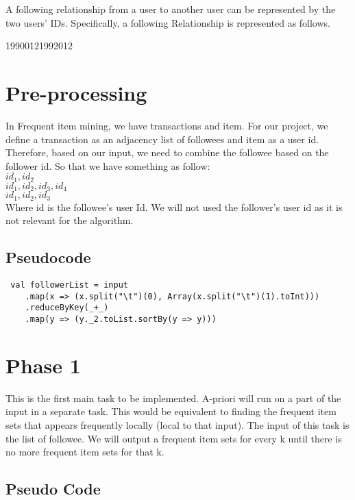 \documentclass[11pt]{article}
\begin{document}
A following relationship from a user to another user can be represented by the two users' IDs.
Specifically, a following Relationship is represented as follows.

1990012\hspace{1cm}1992012 \\

\newpage
\section{Pre-processing}
In Frequent item mining, we have transactions and item.
For our project, we define a transaction as an adjacency list of followees and item as a user id.
Therefore, based on our input, we need to combine the followee based on the follower id.
So that we have something as follow: \\

$id_1, id_2$ \\
$id_1, id_2, id_3, id_4$ \\
$id_1, id_2, id_3$ \\

Where id is the followee's user Id.
We will not used the follower's user id as it is not relevant for the algorithm.

\subsection{Pseudocode}

\begin{lstlisting}
 val followerList = input
    .map(x => (x.split("\t")(0), Array(x.split("\t")(1).toInt)))
    .reduceByKey(_+_)
    .map(y => (y._2.toList.sortBy(y => y)))
\end{lstlisting}

\section{Phase 1}

This is the first main task to be implemented.
A-priori will run on a part of the input in a separate task.
This would be equivalent to finding the frequent item sets that appears frequently locally (local to that input).
The input of this task is the list of followee.
We will output a frequent item sets for every k until there is no more frequent item sets for that k.

\subsection {Pseudo Code}
\end{document}
